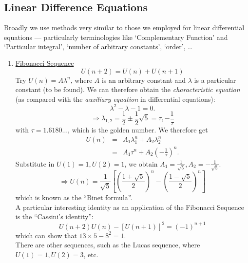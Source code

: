 \documentclass[12pt]{report}
\theoremstyle{definition}
\begin{document}
\subsection{Linear Difference Equations}

Broadly we use methods very similar to those we employed for linear differential equations ---
particularly terminologies like `Complementary Function' and `Particular integral',
`number of arbitrary constants', `order', \ldots

\begin{ex}
    \;

    \begin{enumerate}[label = (\alph*)]
        \item \underline{Fibonacci Sequence}\[
                U(n + 2) = U(n) + U(n + 1)
        \]
        Try $U(n) = A \lambda^{n}$, where $A$ is an arbitrary constant and
        $\lambda$ is a particular constant (to be found).
        We can therefore obtain the \emph{characteristic equation} (as compared
        with the \emph{auxiliary equation} in differential equations):\[
            \lambda^{2} - \lambda - 1 = 0.
        \]\[
        \Rightarrow{} \lambda_{1,2} = \frac{1}{2} \pm \frac{1}{2} \sqrt{5}
        = \tau, -\frac{1}{\tau}
        \]with $\tau = 1.6180\ldots$, which is the golden number. We therefore get
        \begin{eqnarray*}
            U(n) & = & A_1 \lambda_1^{n} + A_2 \lambda_2^{n} \\
                 & = & A_1 \tau^{n} + A_2 {\left(-\frac{1}{\tau}\right)}^{n}.
        \end{eqnarray*}
        Substitute in $U(1) = 1, U(2) = 1$, we obtain $A_1 = \frac{1}{\sqrt{5}}, A_2 = -\frac{1}{\sqrt{5}}$.\[
            \Rightarrow{} U(n) = \frac{1}{\sqrt{5}} \left[{\left(\frac{1 + \sqrt{5}}{2}\right)}^{n}
            - {\left(\frac{1-\sqrt{5}}{2}\right)}^{n}\right] 
        \]which is known as the ``Binet formula''.
        \medskip
        \\A particular interesting identity as an application of the Fibonacci Sequence 
        is the ``Cassini's identity'':\[
            U(n+2) U(n) - {[U(n+1)]}^{2} = {(-1)}^{n+1}
        \]which can show that $13 \times 5 - 8^{2} = 1$.
        \medskip
        \\There are other sequences, such as the Lucas sequence, where
        $U(1) = 1, U(2) = 3$, etc.


\end{enumerate}
\end{ex}
\end{document}
